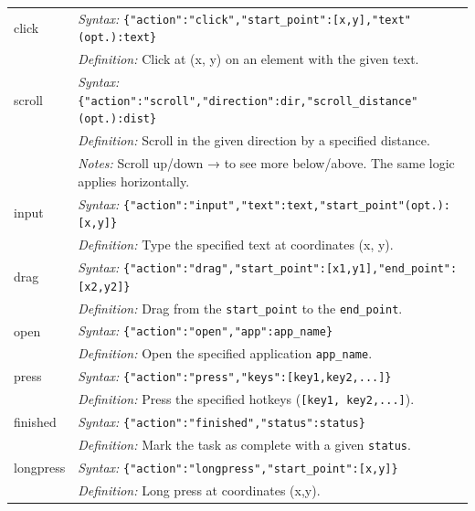 
\begin{table}[h!]
\centering
\setlength{\extrarowheight}{3pt} %
\begin{tabular}{@{}ll@{}} 
\hline %
click & \textit{Syntax:} \texttt{\{"action":"click","start\_point":[x,y],"text"(opt.):text\}} \\
      & \textit{Definition:} Click at (x, y) on an element with the given text. \\
\hline %
scroll & \textit{Syntax:} 
\texttt{\{"action":"scroll","direction":dir,"scroll\_distance"(opt.):dist\}}
\\
       & \textit{Definition:} Scroll in the given direction by a specified distance. \\
       & \textit{Notes:} Scroll up/down → to see more below/above. The same logic applies horizontally. \\
\hline %
input & \textit{Syntax:} 
\texttt{\{"action":"input","text":text,"start\_point"(opt.):[x,y]\}} \\
      & \textit{Definition:} Type the specified text at coordinates (x, y). \\
\hline %
drag & \textit{Syntax:} 
\texttt{\{"action":"drag","start\_point":[x1,y1],"end\_point":[x2,y2]\}} \\
     & \textit{Definition:} Drag from the \texttt{start\_point} to the \texttt{end\_point}.\\
\hline %
open & \textit{Syntax:} 
\texttt{\{"action":"open","app":app\_name\}} \\
     & \textit{Definition:} Open the specified application \texttt{app\_name}.\\
\hline %

press & \textit{Syntax:} 
\texttt{\{"action":"press","keys":[key1,key2,...]\}} \\
      & \textit{Definition:} Press the specified hotkeys (\texttt{[key1, key2,...]}).\\
\hline %

finished & \textit{Syntax:} 
\texttt{\{"action":"finished","status":status\}} \\
         & \textit{Definition:} Mark the task as complete with a given \texttt{status}.\\
\hline %
longpress & \textit{Syntax:} 
\texttt{\{"action":"longpress","start\_point":[x,y]\}} \\
          & \textit{Definition:} Long press at coordinates (x,y). \\
\hline %




\end{tabular}
\end{table}
